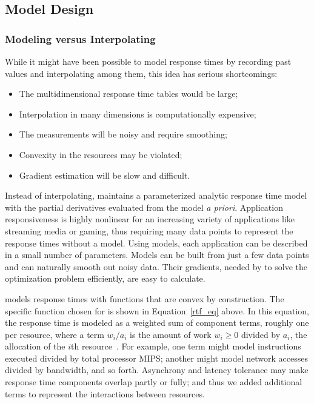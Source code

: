 \subsection{Model Design}
\subsubsection{Modeling versus Interpolating} While it might have been possible to model response times by recording past values and interpolating among them, this idea has serious shortcomings:
\begin{itemize}
\item The multidimensional response time tables would be large;
\item Interpolation in many dimensions is computationally expensive;
\item The measurements will be noisy and require smoothing;
\item Convexity in the resources may be violated;
\item Gradient estimation will be slow and difficult.
\end{itemize}

Instead of interpolating, \pacora maintains a parameterized analytic response time model with the partial derivatives evaluated from the model \emph{a priori}. Application responsiveness is highly nonlinear for an increasing variety of applications like streaming media or gaming, thus requiring many data points to represent the response times without a model. Using models, each application can be described in a small number of parameters.  Models can be built from just a few data points and can naturally smooth out noisy data. Their gradients, needed by \pacora to solve the optimization problem efficiently, are easy to calculate.

\pacora models response times with functions that are convex by construction.
The specific function chosen for \pacora is shown in Equation~\ref{rtf_eq} above.
In this equation, the response time is modeled as a weighted sum of component terms,
roughly one per resource, where a term $w_i/a_i$ is the amount of work $w_i \geq 0$
divided by $a_i$, the allocation of the $i$th resource~\cite{Snav}.
For example, one term might model instructions executed divided by total processor MIPS;
another might model network accesses divided by bandwidth, and so forth.
Asynchrony and latency tolerance may make response time components overlap partly or fully; and thus we added additional terms to represent the interactions between resources.

